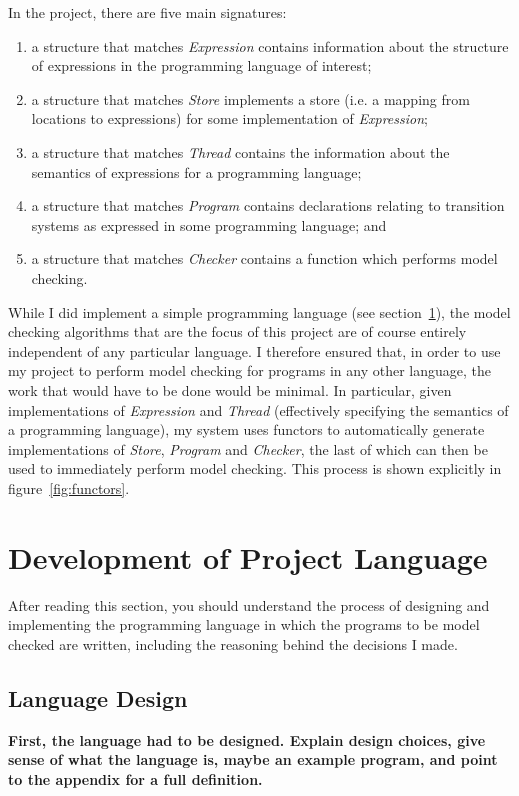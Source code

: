 \documentclass[12pt,a4paper,twoside,openright]{report}
\begin{document}
In the project, there are five main signatures:
\begin{enumerate}
	\item a structure that matches \emph{Expression}
	contains information about the structure of expressions
	in the programming language of interest;
	\item a structure that matches \emph{Store}
	implements a store (i.e. a mapping from locations
	to expressions) for some implementation of \emph{Expression};
	\item a structure that matches \emph{Thread} contains
	the information about the semantics of expressions
	for a programming language;
	\item a structure that matches \emph{Program}
	contains declarations relating to
	transition systems as expressed in some programming
	language; and
	\item a structure that matches \emph{Checker}
	contains a function which performs model checking.
\end{enumerate}

While I did implement a simple programming language
(see section~\ref{sec:language}), the model checking
algorithms that are the focus of this project are of
course entirely independent of any particular language.
I therefore ensured that, in order to use
my project to perform model checking for programs
in any other language, the work that would have to
be done would be minimal. In particular, given implementations
of \emph{Expression} and \emph{Thread} (effectively
specifying the semantics of a programming language), my system uses
functors to automatically generate implementations of
\emph{Store}, \emph{Program} and \emph{Checker}, the
last of which can then be used to immediately perform
model checking. This process is shown explicitly in
figure~\ref{fig:functors}.

\section{Development of Project Language}
\label{sec:language}
After reading this section, you should
understand the process of designing
and implementing the programming
language in which the programs to
be model checked are written,
including the reasoning behind
the decisions I made.

\subsection{Language Design}
\textbf{First, the language had to be designed.
	Explain design choices, give sense of what
	the language is, maybe an example program,
	and point to the appendix for a full definition.}
\end{document}
